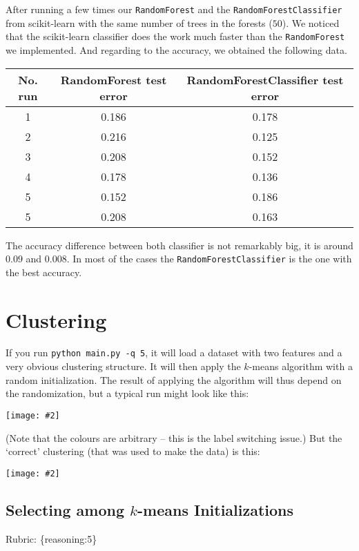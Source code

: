 \documentclass{article}
\def\rubric#1{\gre{Rubric: \{#1\}}}{}
\def\gre#1{{\color{gre}#1}}
\def\ans#1{{\color{ans}#1}}
\newcommand{\centerfig}[2]{\begin{center}\texttt{[image: \#2]}\end{center}}
\begin{document}
{{\ans{
   After running a few times our \texttt{RandomForest} and the \texttt{RandomForestClassifier}
   from scikit-learn with the same number of trees in the forests ($50$). We noticed that the 
   scikit-learn classifier does the work much faster than the \texttt{RandomForest} we implemented. 
   And regarding to the accuracy, we obtained the following data. \\ 
   \scriptsize
   \setlength{\tabcolsep}{10pt}
   \begin{center}
   \begin{tabular}{SSS} \toprule
      {No. run} & {RandomForest test error} & {RandomForestClassifier test error} \\ \midrule
      {1} & 0.186 & 0.178 \\ 
      {2} & 0.216 & 0.125 \\ 
      {3} & 0.208 & 0.152 \\ 
      {4} & 0.178 & 0.136 \\ 
      {5} & 0.152 & 0.186 \\ 
      {5} & 0.208 & 0.163 \\ \bottomrule
   \end{tabular}
   \end{center}
   \normalsize
   The accuracy difference between both classifier is not remarkably big, it is around $0.09$ and $0.008$. In 
   most of the cases the \texttt{RandomForestClassifier} is the one with the best accuracy.
}
}
}

\section{Clustering}

If you run \verb|python main.py -q 5|, it will load a dataset with two features
and a very obvious clustering structure. It will then apply the $k$-means algorithm
with a random initialization. The result of applying the
algorithm will thus depend on the randomization, but a typical run might look like this:
\centerfig{.5}{../figs/kmeans_basic.png}
(Note that the colours are arbitrary -- this is the label switching issue.)
But the `correct' clustering (that was used to make the data) is this:
\centerfig{.5}{../figs/kmeans_good.png}


\subsection{Selecting among $k$-means Initializations}
\rubric{reasoning:5}
\end{document}
